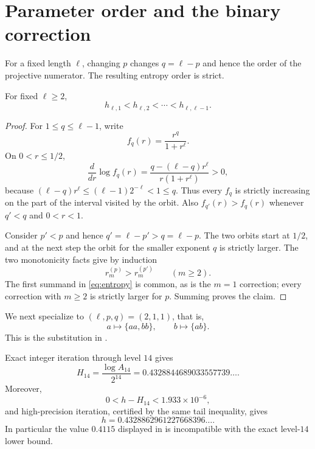 \section{Parameter order and the binary correction}
\label{sec:example}

For a fixed length $\ell$, changing $p$ changes $q=\ell-p$ and hence the
order of the projective numerator.  The resulting entropy order is strict.

\begin{proposition}
\label{prop:monotone}
For fixed $\ell\ge2$,
\[
 h_{\ell,1}<h_{\ell,2}<\cdots<h_{\ell,\ell-1}.
\]
\end{proposition}

\begin{proof}
For $1\le q\le\ell-1$, write
\[
 f_q(r)=\frac{r^q}{1+r^\ell}.
\]
On $0<r\le1/2$,
\[
 \frac{d}{dr}\log f_q(r)
 =\frac{q-(\ell-q)r^\ell}{r(1+r^\ell)}>0,
\]
because $(\ell-q)r^\ell\le(\ell-1)2^{-\ell}<1\le q$.
Thus every $f_q$ is strictly increasing on the part of the interval visited
by the orbit.  Also $f_{q'}(r)>f_q(r)$ whenever $q'<q$ and $0<r<1$.

Consider $p'<p$ and hence $q'=\ell-p'>q=\ell-p$.  The two orbits start at
$1/2$, and at the next step the orbit for the smaller exponent $q$ is
strictly larger.  The two monotonicity facts give by induction
\[
 r_m^{(p)}>r_m^{(p')}\qquad(m\ge2).
\]
The first summand in \cref{eq:entropy} is common, as is the $m=1$ correction;
every correction with $m\ge2$ is strictly larger for $p$.  Summing proves
the claim.
\end{proof}

We next specialize to $(\ell,p,q)=(2,1,1)$, that is,
\begin{equation}
 a\mapsto\{aa,bb\},\qquad b\mapsto\{ab\}.
 \label{eq:binary-example}
\end{equation}
This is the substitution in \cite[Example~4.8]{Mitchell2024}.

\begin{corollary}
\label{cor:binary}
Exact integer iteration through level $14$ gives
\begin{equation}
 H_{14}=\frac{\log A_{14}}{2^{14}}
 =0.4328844689033557739\ldots .
 \label{eq:H14}
\end{equation}
Moreover,
\begin{equation}
 0<h-H_{14}<1.933\times10^{-6},
 \label{eq:H14-tail}
\end{equation}
and high-precision iteration, certified by the same tail inequality, gives
\begin{equation}
 h=0.4328862961227668396\ldots .
 \label{eq:corrected-value}
\end{equation}
In particular the value $0.4115$ displayed in
\cite[Example~4.8]{Mitchell2024} is incompatible with the exact level-$14$
lower bound.
\end{corollary}

